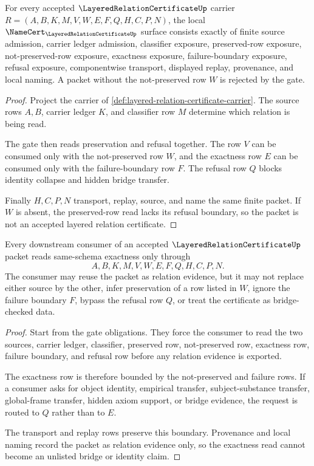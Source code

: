 \begin{theorem}
\label{thm:layered-relation-certificate-gate-obligations}
For every accepted $\LayeredRelationCertificateUp$ carrier $R=(A,B,K,M,V,W,E,F,Q,H,C,P,N)$, the local $\NameCert_{\LayeredRelationCertificateUp}$ surface consists exactly of finite source admission, carrier ledger admission, classifier exposure, preserved-row exposure, not-preserved-row exposure, exactness exposure, failure-boundary exposure, refusal exposure, componentwise transport, displayed replay, provenance, and local naming. A packet without the not-preserved row $W$ is rejected by the gate.
\end{theorem}
\begin{proof}
Project the carrier of \autoref{def:layered-relation-certificate-carrier}. The source rows $A,B$, carrier ledger $K$, and classifier row $M$ determine which relation is being read.

The gate then reads preservation and refusal together. The row $V$ can be consumed only with the not-preserved row $W$, and the exactness row $E$ can be consumed only with the failure-boundary row $F$. The refusal row $Q$ blocks identity collapse and hidden bridge transfer.

Finally $H,C,P,N$ transport, replay, source, and name the same finite packet. If $W$ is absent, the preserved-row read lacks its refusal boundary, so the packet is not an accepted layered relation certificate.
\end{proof}

\begin{theorem}
\label{thm:layered-relation-certificate-exactness-boundary}
Every downstream consumer of an accepted $\LayeredRelationCertificateUp$ packet reads same-schema exactness only through
$$
A,B,K,M,V,W,E,F,Q,H,C,P,N .
$$
The consumer may reuse the packet as relation evidence, but it may not replace either source by the other, infer preservation of a row listed in $W$, ignore the failure boundary $F$, bypass the refusal row $Q$, or treat the certificate as bridge-checked data.
\end{theorem}
\begin{proof}
Start from the gate obligations. They force the consumer to read the two sources, carrier ledger, classifier, preserved row, not-preserved row, exactness row, failure boundary, and refusal row before any relation evidence is exported.

The exactness row is therefore bounded by the not-preserved and failure rows. If a consumer asks for object identity, empirical transfer, subject-substance transfer, global-frame transfer, hidden axiom support, or bridge evidence, the request is routed to $Q$ rather than to $E$.

The transport and replay rows preserve this boundary. Provenance and local naming record the packet as relation evidence only, so the exactness read cannot become an unlisted bridge or identity claim.
\end{proof}


